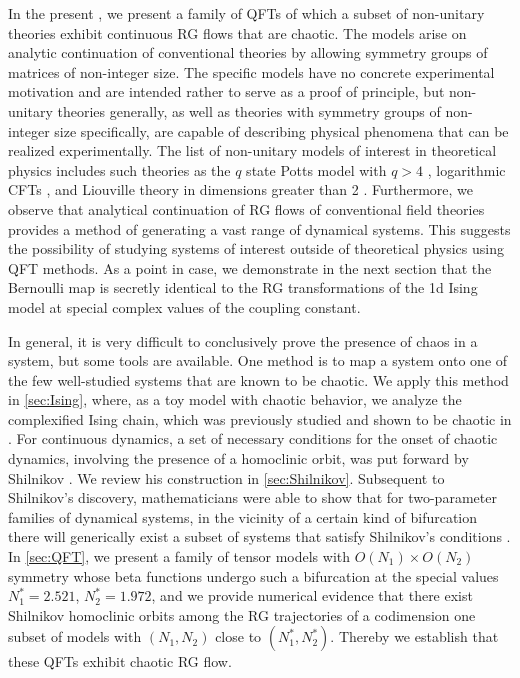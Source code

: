 In the present \paper{}, we present a family of QFTs of which a subset of non-unitary theories exhibit continuous RG flows that are chaotic. The models arise on analytic continuation of conventional theories by allowing symmetry groups of matrices of non-integer size. The specific models have no concrete experimental motivation and are intended rather to serve as a proof of principle, but non-unitary theories generally, as well as theories with symmetry groups of non-integer size specifically, are capable of describing physical phenomena that can be realized experimentally. The list of non-unitary models of interest in theoretical physics includes such theories as the $q$ state Potts model with $q>4$ \cite{1982RvMP...54..235W,gorbenko2018walking,Gorbenko:2018dtm}, logarithmic CFTs \cite{Gurarie:1993xq,cardy2013logarithmic}, and Liouville theory in dimensions greater than 2 \cite{levy2018liouville}. Furthermore, we observe that analytical continuation of RG flows of conventional field theories provides a method of generating a vast range of dynamical systems. This suggests the possibility of studying systems of interest outside of theoretical physics using QFT methods. As a point in case, we demonstrate in the next section that the Bernoulli map is secretly identical to the RG transformations of the 1d Ising model at special complex values of the coupling constant.

In general, it is very difficult to conclusively prove the presence of chaos in a system, but some tools are available. One method is to map a system onto one of the few well-studied systems that are known to be chaotic. We apply this method in \cref{sec:Ising}, where, as a toy model with chaotic behavior, we analyze the complexified Ising chain, which was previously studied and shown to be chaotic in \cite{Dolan:1994wt}. For continuous dynamics, a set of necessary conditions for the onset of chaotic dynamics, involving the presence of a homoclinic orbit, was put forward by Shilnikov \cite{shilnikov1965case}. We review his construction in \cref{sec:Shilnikov}. Subsequent to Shilnikov's discovery, mathematicians were able to show that for two-parameter families of dynamical systems, in the vicinity of a certain kind of bifurcation there will generically exist a subset of systems that satisfy Shilnikov's conditions \cite{baldoma2020hopf}. In \cref{sec:QFT}, we present a family of tensor models with $O(N_1)\times O(N_2)$ symmetry whose beta functions undergo such a bifurcation at the special values $N^\ast_1=2.521$, $N^\ast_2=1.972$, and we provide numerical evidence that there exist Shilnikov homoclinic orbits among the RG trajectories of a codimension one subset of models with $(N_1,N_2)$ close to $(N^\ast_1,N^\ast_2)$. Thereby we establish that these QFTs exhibit chaotic RG flow.



